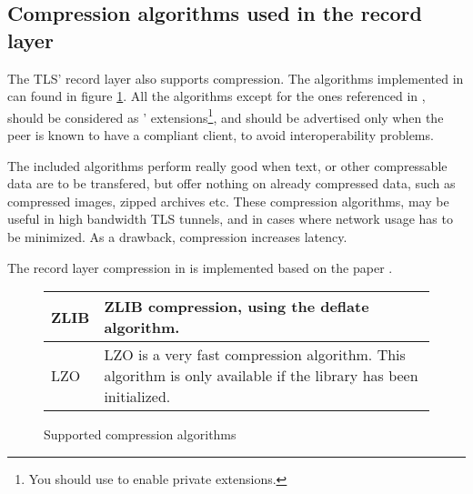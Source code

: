 \subsection{Compression algorithms used in the record layer}
The TLS' record layer also supports compression. The algorithms
implemented in \gnutls{} can found in figure \ref{fig:compression}.
All the algorithms except for the ones referenced in \cite{TLSCOMP}, should be 
considered as \gnutls' extensions\footnote{You should use 
to enable private extensions.}, and
should be advertised only when the peer is known to have a compliant client,
to avoid interoperability problems.
\par
The included algorithms perform really good when text, or other
compressable data are to be transfered, but offer nothing on already 
compressed data, such as compressed images, zipped archives etc.
These compression algorithms, may be useful in high bandwidth TLS tunnels,
and in cases where network usage has to be minimized. As a drawback, 
compression increases latency.

\par
The record layer compression in \gnutls{} is implemented based on
the paper \cite{TLSCOMP}.

\begin{figure}[hbtp]
\begin{tabular}{|l|p{9cm}|}

\hline
ZLIB & ZLIB compression, using the deflate algorithm.
\\
\hline
LZO & LZO is a very fast compression algorithm. This algorithm is only
available if the \gnutlse{} library has been initialized.
\\
\hline
\end{tabular}
\caption{Supported compression algorithms}
\label{fig:compression}
\end{figure}


